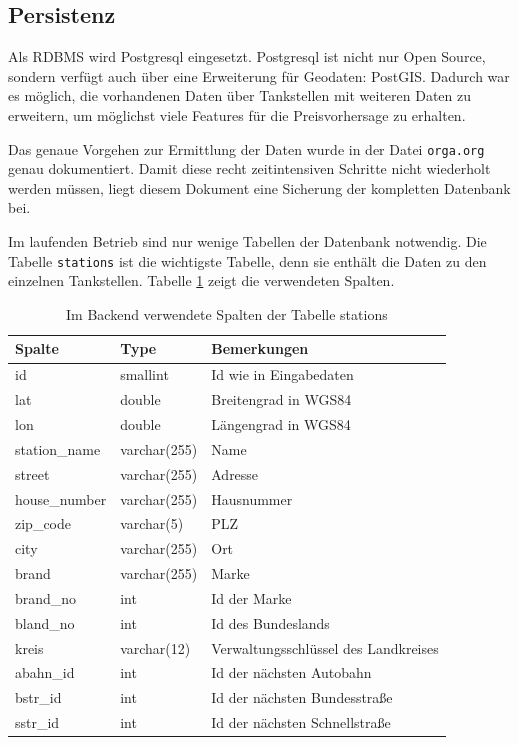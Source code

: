 \documentclass[
ngerman          %
,a4paper          %
,11pt
,pdftex
]{report}
\begin{document}
\subsection{Persistenz}

Als \ac{RDBMS} wird Postgresql eingesetzt. Postgresql ist nicht nur Open Source, sondern verfügt auch über eine Erweiterung für Geodaten: PostGIS. Dadurch war es möglich, die vorhandenen Daten über Tankstellen mit weiteren Daten zu erweitern, um möglichst viele Features für die Preisvorhersage zu erhalten.

Das genaue Vorgehen zur Ermittlung der Daten wurde in der Datei \texttt{orga.org} genau dokumentiert. Damit diese recht zeitintensiven Schritte nicht wiederholt werden müssen, liegt diesem Dokument eine Sicherung der kompletten Datenbank bei.

Im laufenden Betrieb sind nur wenige Tabellen der Datenbank notwendig. Die Tabelle \texttt{stations} ist die wichtigste Tabelle, denn sie enthält die Daten zu den einzelnen Tankstellen. Tabelle \ref{tab:stations} zeigt die verwendeten Spalten.

\begin{table}[h]
	\centering
	\begin{tabular}{l l l}
		\textbf{Spalte} & \textbf{Type} & \textbf{Bemerkungen} \\ 
		\hline \hline
		id & smallint & Id wie in Eingabedaten \\
        lat & double & Breitengrad in WGS84 \\
        lon & double & Längengrad in WGS84 \\
        station\_name & varchar(255) & Name \\
        street & varchar(255) & Adresse \\
        house\_number & varchar(255) & Hausnummer \\
        zip\_code & varchar(5) & PLZ  \\
        city & varchar(255) & Ort \\
        brand & varchar(255) & Marke  \\
        brand\_no & int & Id der Marke \\
        bland\_no & int & Id des Bundeslands \\
        kreis & varchar(12) & Verwaltungsschlüssel des Landkreises \\
        abahn\_id & int & Id der nächsten Autobahn \\
        bstr\_id & int & Id der nächsten Bundesstraße \\
        sstr\_id & int & Id der nächsten Schnellstraße \\
		\hline 
	\end{tabular}
	\caption{Im Backend verwendete Spalten der Tabelle stations}
	\label{tab:stations}	
\end{table} 
\end{document}
